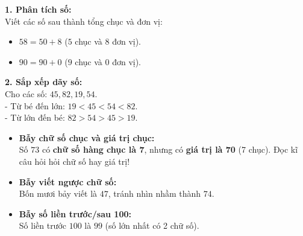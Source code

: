 \documentclass[11pt,a4paper]{article}
\begin{document}
\vspace{-1.5mm}
\noindent
\begin{minipage}[t]{0.49\textwidth}\vspace{0pt}
\begin{tcolorbox}[
  enhanced,
  colback=green!4!white,
  colframe=green!60!black,
  arc=2mm, boxrule=0.8pt,
  left=2mm, right=2mm, top=1.8mm, bottom=1.8mm,
  title={\footnotesize\bfseries\color{white}\faCheckCircle\ 4. Ví dụ thực hành chuẩn mực}
]
{\footnotesize
\textbf{1. Phân tích số:}\\
Viết các số sau thành tổng chục và đơn vị:
\begin{itemize}\setlength{\itemsep}{0.5pt}\setlength{\leftskip}{-2.5mm}
  \item $58 = 50 + 8$ ($5$ chục và $8$ đơn vị).
  \item $90 = 90 + 0$ ($9$ chục và $0$ đơn vị).
\end{itemize}
\textbf{2. Sắp xếp dãy số:}\\
Cho các số: $45, 82, 19, 54$.\\
- Từ bé đến lớn: $19 < 45 < 54 < 82$.\\
- Từ lớn đến bé: $82 > 54 > 45 > 19$.
}
\end{tcolorbox}
\end{minipage}
\hfill
\begin{minipage}[t]{0.49\textwidth}\vspace{0pt}
\begin{tcolorbox}[
  enhanced,
  colback=red!4!white,
  colframe=red!75!black,
  arc=2mm, boxrule=0.8pt,
  left=2mm, right=2mm, top=1.8mm, bottom=1.8mm,
  title={\footnotesize\bfseries\color{white}\faExclamationTriangle\ 5. Mẹo tránh bẫy trắc nghiệm}
]
{\footnotesize
\begin{itemize}\setlength{\itemsep}{1pt}\setlength{\leftskip}{-2.5mm}
  \item \textbf{Bẫy chữ số chục và giá trị chục:}\\
  Số $73$ có \textbf{chữ số hàng chục là 7}, nhưng có \textbf{giá trị là 70} (7 chục). Đọc kĩ câu hỏi hỏi chữ số hay giá trị!
  \item \textbf{Bẫy viết ngược chữ số:}\\
  Bốn mươi bảy viết là $47$, tránh nhìn nhầm thành $74$.
  \item \textbf{Bẫy số liền trước/sau 100:}\\
  Số liền trước $100$ là $99$ (số lớn nhất có 2 chữ số).
\end{itemize}
}
\end{tcolorbox}
\end{minipage}
\end{document}
